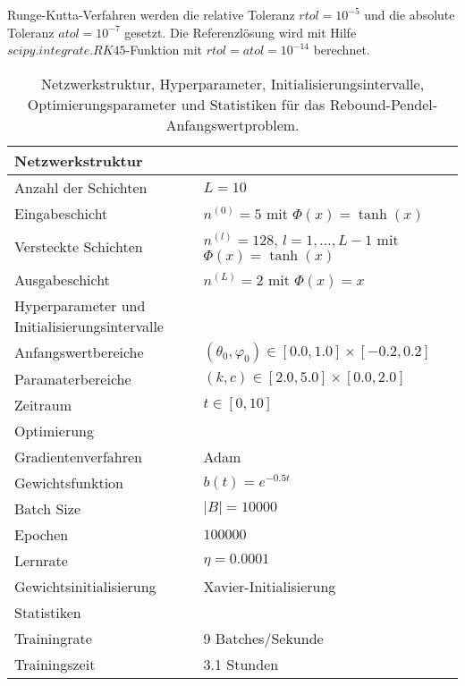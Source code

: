Runge-Kutta-Verfahren werden die relative Toleranz $rtol=10^{-5}$ und die absolute Toleranz $atol=10^{-7}$ gesetzt.
Die Referenzlösung wird mit Hilfe $scipy.integrate.RK45$-Funktion mit $rtol=atol=10^{-14}$ berechnet.
\begin{table}
       \renewcommand{\arraystretch}{1.0}
       \centering
       \begin{tabular}{ l | l }
              \hline
              Netzwerkstruktur & \\
              \hline
              Anzahl der Schichten & $L=10$ \\
              Eingabeschicht & $n^{(0)}=5$ mit $\Phi(x)=\tanh(x)$ \\
              Versteckte Schichten & $n^{(l)}=128$, $l = 1, \dots, L-1$ mit $\Phi(x)=\tanh(x)$ \\
              Ausgabeschicht & $n^{(L)}=2$ mit $\Phi(x)=x$ \\
              \hline
              Hyperparameter und Initialisierungsintervalle & \\
              \hline
              Anfangswertbereiche & $(\theta_0, \varphi_0) \in [0.0, 1.0] \times [-0.2, 0.2]$ \\
              Paramaterbereiche & $(k, c) \in [2.0, 5.0] \times [0.0, 2.0]$ \\
              Zeitraum & $t \in [0, 10]$ \\
              \hline
              Optimierung & \\
              \hline
              Gradientenverfahren & Adam \\
              Gewichtsfunktion & $b(t)=e^{-0.5t}$ \\
              Batch Size & $|B|=10000$ \\
              Epochen & $100000$ \\
              Lernrate & $\eta= 0.0001$ \\
              Gewichtsinitialisierung & Xavier-Initialisierung \\
              \hline
              Statistiken & \\
              \hline
              Trainingrate & 9 Batches/Sekunde  \\
              Trainingszeit & 3.1 Stunden \\
              \hline
       \end{tabular}
       \caption{Netzwerkstruktur, Hyperparameter, Initialisierungsintervalle, Optimierungsparameter und Statistiken
       für das Rebound-Pendel-Anfangswertproblem.}
\label{rebound-pendulum-table}
\end{table}
